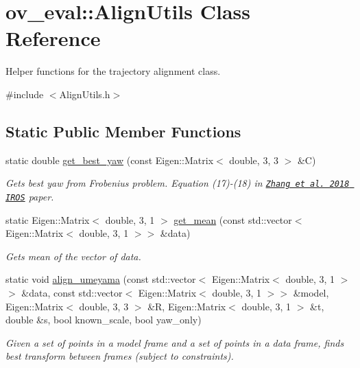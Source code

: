\hypertarget{classov__eval_1_1AlignUtils}{}\section{ov\+\_\+eval\+:\+:Align\+Utils Class Reference}
\label{classov__eval_1_1AlignUtils}


Helper functions for the trajectory alignment class.  




{\ttfamily \#include $<$Align\+Utils.\+h$>$}

\subsection*{Static Public Member Functions}
\begin{DoxyCompactItemize}
\item 
static double \hyperlink{classov__eval_1_1AlignUtils_a6eafc0d55cb43fa6d2718a707697abff}{get\+\_\+best\+\_\+yaw} (const Eigen\+::\+Matrix$<$ double, 3, 3 $>$ \&C)
\begin{DoxyCompactList}\small\item\em Gets best yaw from Frobenius problem. Equation (17)-\/(18) in \href{http://rpg.ifi.uzh.ch/docs/IROS18_Zhang.pdf}{\tt Zhang et al. 2018 I\+R\+OS} paper. \end{DoxyCompactList}\item 
static Eigen\+::\+Matrix$<$ double, 3, 1 $>$ \hyperlink{classov__eval_1_1AlignUtils_a773b70968bab53fcaf45db308a70fe82}{get\+\_\+mean} (const std\+::vector$<$ Eigen\+::\+Matrix$<$ double, 3, 1 $>$$>$ \&data)
\begin{DoxyCompactList}\small\item\em Gets mean of the vector of data. \end{DoxyCompactList}\item 
static void \hyperlink{classov__eval_1_1AlignUtils_a0047243dabf7448c01fdb118e13061e8}{align\+\_\+umeyama} (const std\+::vector$<$ Eigen\+::\+Matrix$<$ double, 3, 1 $>$$>$ \&data, const std\+::vector$<$ Eigen\+::\+Matrix$<$ double, 3, 1 $>$$>$ \&model, Eigen\+::\+Matrix$<$ double, 3, 3 $>$ \&R, Eigen\+::\+Matrix$<$ double, 3, 1 $>$ \&t, double \&s, bool known\+\_\+scale, bool yaw\+\_\+only)
\begin{DoxyCompactList}\small\item\em Given a set of points in a model frame and a set of points in a data frame, finds best transform between frames (subject to constraints). \end{DoxyCompactList}\item 
$$
\end{DoxyCompactItemize}
